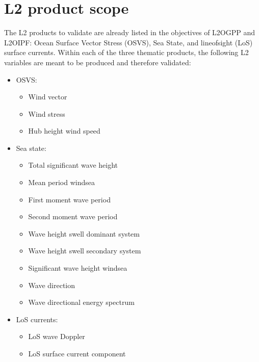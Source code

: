 \documentclass[a4paper,10pt,english]{sphinxmanual}
\begin{document}
\section{L2 product scope}
\label{\detokenize{01_introduction:l2-product-scope}}
\sphinxAtStartPar
The L2 products to validate are already listed in the objectives of L2O\sphinxhyphen{}GPP and L2O\sphinxhyphen{}IPF: Ocean Surface Vector Stress (OSVS), Sea State, and line\sphinxhyphen{}of\sphinxhyphen{}sight (LoS) surface currents. Within each of the three thematic products, the following L2 variables are meant to be produced and therefore validated:
\begin{itemize}
\item {} 
\sphinxAtStartPar
OSVS:
\begin{itemize}
\item {} 
\sphinxAtStartPar
Wind vector

\item {} 
\sphinxAtStartPar
Wind stress

\item {} 
\sphinxAtStartPar
Hub height wind speed

\end{itemize}

\item {} 
\sphinxAtStartPar
Sea state:
\begin{itemize}
\item {} 
\sphinxAtStartPar
Total significant wave height

\item {} 
\sphinxAtStartPar
Mean period wind\sphinxhyphen{}sea

\item {} 
\sphinxAtStartPar
First moment wave period

\item {} 
\sphinxAtStartPar
Second moment wave period

\item {} 
\sphinxAtStartPar
Wave height swell dominant system

\item {} 
\sphinxAtStartPar
Wave height swell secondary system

\item {} 
\sphinxAtStartPar
Significant wave height wind\sphinxhyphen{}sea

\item {} 
\sphinxAtStartPar
Wave direction

\item {} 
\sphinxAtStartPar
Wave directional energy spectrum

\end{itemize}

\item {} 
\sphinxAtStartPar
LoS currents:
\begin{itemize}
\item {} 
\sphinxAtStartPar
LoS wave Doppler

\item {} 
\sphinxAtStartPar
LoS surface current component

\end{itemize}

\end{itemize}
\end{document}
